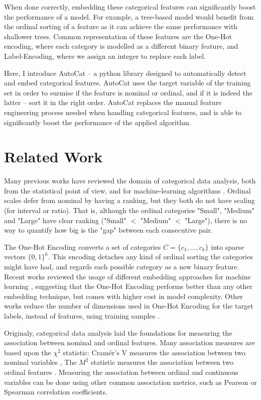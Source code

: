 \documentclass{article}
\begin{document}
When done correctly, embedding these categorical features can significantly boost the performance of a model. For example, a tree-based model would benefit from the ordinal sorting of a feature as it can achieve the same performance with shallower trees. 
Common representation of these features are the One-Hot encoding, where each category is modelled as a different binary feature, and Label-Encoding, where we assign an integer to replace each label.

Here, I introduce AutoCat -- a python library designed to automatically detect and embed categorical features. AutoCat uses the target variable of the training set in order to surmise if the feature is nominal or ordinal, and if it is indeed the latter -- sort it in the right order. AutoCat replaces the manual feature engineering process needed when handling categorical features, and is able to significantly boost the performance of the applied algorithm.

\section{Related Work}
Many previous works have reviewed the domain of categorical data analysis, both from the statistical point of view, and for machine-learning algorithms \cite{agresti2018introduction, Stevens1946}. Ordinal scales defer from nominal by having a ranking, but they both do not have scaling (for interval or ratio). That is, although the ordinal categories "Small", "Medium" and "Large" have clear ranking ("Small" $<$ "Medium" $<$ "Large"), there is no way to quantify how big is the "gap" between each consecutive pair.

The One-Hot Encoding converts a set of categories $C = \{c_1, \dots, c_k\}$ into sparse vectors $\{0, 1\}^k$. This encoding detaches any kind of ordinal sorting the categories might have had, and regards each possible category as a new binary feature.
Recent works reviewed the usage of different embedding approaches for machine learning \cite{Potdar2017}, suggesting that the One-Hot Encoding performs better than any other embedding technique, but comes with higher cost in model complexity. 
Other works reduce the number of dimensions used in One-Hot Encoding for the target labels, instead of features, using training samples \cite{Rodrguez2018}.

Originaly, categorical data analysis laid the foundations for measuring the association between nominal and ordinal features. Many association measures are based upon the $\chi ^2$ statistic: Cramér's V measures the association between two nominal variables \cite{cramer1999mathematical}, The $M^2$ statistic measures the association between two ordinal features \cite{agresti2007an}. Measuring the association between ordinal and continuous variables can be done using other common association metrics, such as Pearson or Spearman correlation coefficients. 
\end{document}
